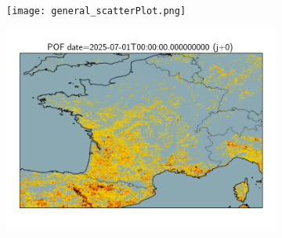 \documentclass{article}
\begin{document}
\begin{figure}[H]
    \centering
    \begin{subfigure}[b]{0.455\textwidth}
        \centering
        \texttt{[image: general\_scatterPlot.png]} %
    \end{subfigure}
    \begin{subfigure}[b]{0.535\textwidth}
        \centering
        \includegraphics[width=0.85\linewidth]{general_pof_j0.png} %
    \end{subfigure}
\end{figure}
\end{document}
